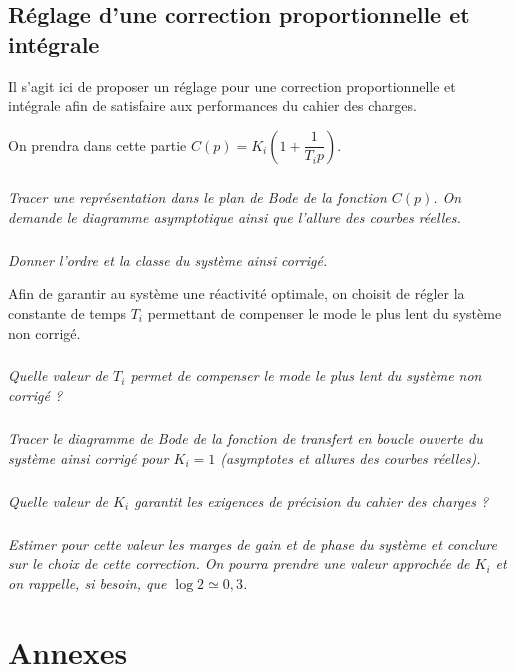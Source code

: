 \documentclass[10pt,fleqn]{article} %
\begin{document}
\subsection{Réglage d'une correction proportionnelle et intégrale}
\begin{obj}
Il s'agit ici de proposer un réglage pour une correction proportionnelle et intégrale afin de satisfaire aux performances du cahier des charges.
\end{obj}
On prendra dans cette partie $C(p)=K_i \left(1+ \dfrac{1}{T_i p}\right)$.
\subparagraph{}\textit{Tracer une représentation dans le plan de Bode de la fonction $C(p)$. On demande le diagramme asymptotique ainsi que l'allure des courbes réelles.}

\subparagraph{}\textit{Donner l'ordre et la classe du système ainsi corrigé.  }

Afin de garantir au système une réactivité optimale, on choisit de régler la constante de temps $T_i$ permettant de compenser le mode le plus lent du système non corrigé.
\subparagraph{}\textit{Quelle valeur de $T_i$ permet de compenser le mode le plus lent du système non corrigé ?  }

\subparagraph{}\textit{Tracer le diagramme de Bode de la fonction de transfert en boucle ouverte du système ainsi corrigé pour  $K_i = 1$ (asymptotes et allures des courbes réelles).}

\subparagraph{}\textit{Quelle valeur de $K_i$ garantit les exigences de précision du cahier des charges ?}

\subparagraph{}\textit{Estimer pour cette valeur les marges de gain et de phase du système et conclure sur le choix de cette correction. On pourra prendre une valeur approchée de $K_i$ et on rappelle, si besoin, que  $\log 2 \simeq 0,3$.}

\section{Annexes}
\end{document}
